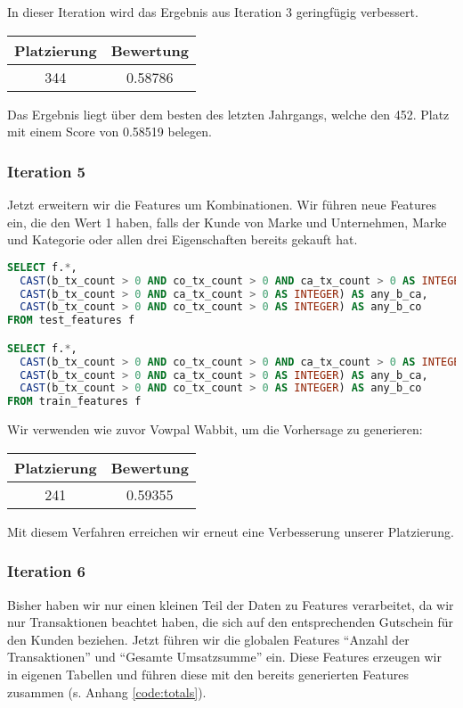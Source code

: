 In dieser Iteration wird das Ergebnis aus Iteration 3 geringfügig verbessert.

\begin{tabular}{|c|c|}
	\hline \textbf{Platzierung} & \textbf{Bewertung} \\ 
	\hline 344 & 0.58786  \\ 
	\hline 
\end{tabular}

Das Ergebnis liegt über dem besten des letzten Jahrgangs, welche den 452. Platz mit einem Score von 0.58519 belegen.

\subsubsection{Iteration 5}

Jetzt erweitern wir die Features um Kombinationen. Wir führen neue Features ein, die den Wert 1 haben,
falls der Kunde von Marke und Unternehmen, Marke und Kategorie oder allen drei Eigenschaften bereits
gekauft hat.

\begin{lstlisting}[language=SQL]
SELECT f.*, 
  CAST(b_tx_count > 0 AND co_tx_count > 0 AND ca_tx_count > 0 AS INTEGER) AS any_b_co_ca,
  CAST(b_tx_count > 0 AND ca_tx_count > 0 AS INTEGER) AS any_b_ca,
  CAST(b_tx_count > 0 AND co_tx_count > 0 AS INTEGER) AS any_b_co
FROM test_features f

SELECT f.*, 
  CAST(b_tx_count > 0 AND co_tx_count > 0 AND ca_tx_count > 0 AS INTEGER) AS any_b_co_ca,
  CAST(b_tx_count > 0 AND ca_tx_count > 0 AS INTEGER) AS any_b_ca,
  CAST(b_tx_count > 0 AND co_tx_count > 0 AS INTEGER) AS any_b_co
FROM train_features f
\end{lstlisting}

Wir verwenden wie zuvor Vowpal Wabbit, um die Vorhersage zu generieren:

\begin{tabular}{|c|c|}
	\hline \textbf{Platzierung} & \textbf{Bewertung} \\ 
	\hline 241 & 0.59355  \\ 
	\hline 
\end{tabular}

Mit diesem Verfahren erreichen wir erneut eine Verbesserung unserer Platzierung.

\subsubsection{Iteration 6}
Bisher haben wir nur einen kleinen Teil der Daten zu Features verarbeitet, da wir nur Transaktionen
beachtet haben, die sich auf den entsprechenden Gutschein für den Kunden beziehen. Jetzt führen wir die globalen Features "`Anzahl der Transaktionen"' und "`Gesamte Umsatzsumme"' ein. Diese Features erzeugen wir in eigenen Tabellen und führen diese mit den bereits generierten Features zusammen (s. Anhang \ref{code:totals}).

